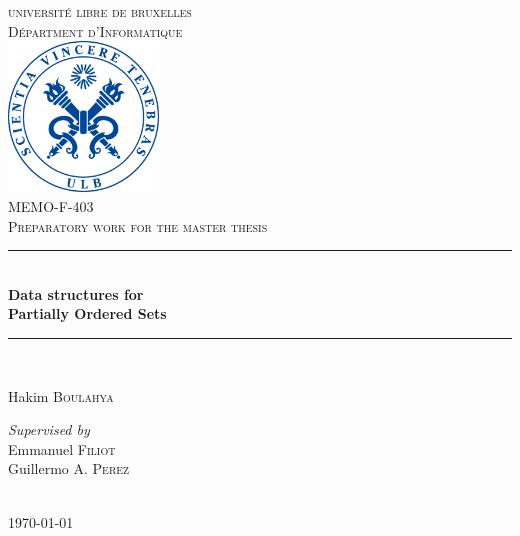 \documentclass[letterpaper]{article}
\theoremstyle{definition}
\newcommand{\HRule}{\rule{\linewidth}{0.2mm}} %
\begin{document}
\begin{titlepage}

\begin{center}


\textsc{\LARGE universit\'e libre de bruxelles}\\[1.0cm]
\textsc{\Large D\'epartment d'Informatique}\\[1.0cm]

\includegraphics[width=0.3\textwidth]{images/ulblogo.jpg}~\\[1cm]

\textsc{
\large MEMO-F-403 \\
\Large  Preparatory work for the master thesis
 \\[1.0cm]}
\HRule \\[0.3cm]

{ \huge \bfseries Data structures for \\
Partially Ordered Sets \\[0.3cm] }

\HRule \\[1cm]

\noindent
\begin{center} \large

\Large Hakim \textsc{Boulahya}\\
\end{center}
\begin{center} \large

\emph{Supervised by} \\
\Large Emmanuel \textsc{Filiot} \\
\Large Guillermo A. \textsc{Perez} \\

\end{center}

\\[1cm]
{\large \today}

\end{center}
\end{titlepage}
\end{document}
